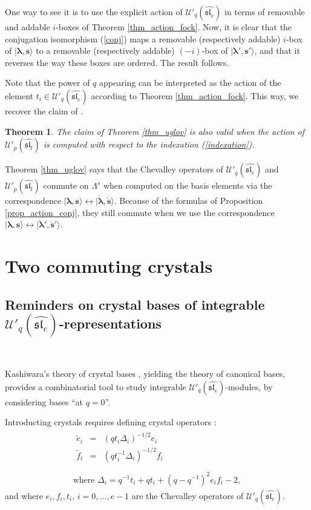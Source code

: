 \documentclass[twoside,12pt]{amsart}
\theoremstyle{plain}
\newcommand{\bs}{\mathbf{s}}
\newcommand{\la}{\lambda}
\newcommand{\La}{\Lambda}
\newcommand{\De}{\Delta}
\newcommand{\bla}{\boldsymbol{\la}}
\newcommand{\te}{\tilde{e}}
\newcommand{\tf}{\tilde{f}}
\newcommand{\dbs}{\dot{\bs}}
\newcommand{\dbla}{\dot{\bla}}
\newcommand{\Ue}{\mathcal{U}'_q (\widehat{\mathfrak{sl}_e})}
\newcommand{\Ul}{\mathcal{U}'_p (\widehat{\mathfrak{sl}_l})}
\newtheorem{thm}[num]{Theorem}
\theoremstyle{remark}
\begin{document}
\proof
One way to see it is to use the explicit action of $\Ue$ 
in terms of removable and addable $i$-boxes
of Theorem \ref{thm_action_fock}. 
Now, it is clear that the conjugation isomorphism (\ref{conj})
maps a removable (respectively addable) $i$-box of $|\bla,\bs\rangle$
to a removable (respectively addable) $(-i)$-box of $|\bla',\bs'\rangle$,
and that it reverses the way these boxes are ordered.
The result follows.
\endproof


Note that the power of $q$ appearing can be interpreted as the action of the
element $t_i\in\Ue$ according to Theorem \ref{thm_action_fock}.
This way, we recover the claim of \cite[Proposition 5.10]{Uglov1999}.

\medskip

\begin{thm}\label{thm_uglov_bis}
The claim of Theorem \ref{thm_uglov} is also valid when the action
of $\Ul$ is computed with respect to the indexation (\ref{indexation}).
\end{thm}

\proof 
Theorem \ref{thm_uglov} says that the Chevalley operators of $\Ue$ and $\Ul$ commute on $\La^s$
when computed on the basis elements via
the correspondence $|\bla,\bs\rangle \leftrightarrow |\dbla,\dbs\rangle$.
Because of the formulas of Proposition \ref{prop_action_conj}, they still commute when we use the correspondence
$|\bla,\bs\rangle \leftrightarrow |\dbla',\dbs'\rangle$.
\endproof
  
  
  
  
  
  
\section{Two commuting crystals}\label{double_crystal}

\subsection{Reminders on crystal bases of integrable $\Ue$-representations}\label{crystal_bases}\


Kashiwara's theory of crystal bases \cite{Kashiwara1990},
yielding the theory of canonical bases, 
provides a combinatorial tool to study integrable $\Ue$-modules, by considering bases ``at $q=0$''.

Introducting crystals requires defining crystal operators \cite[Section 2.4]{Kashiwara1991}:
\begin{equation}\label{def_crystal_op}
\begin{array}{c}
\begin{array}{lcl}
\te^{}_i & = & (q t_i \De_i)^{-1/2}e_i \\
\tf^{}_i & = & (q t_i^{-1} \De_i)^{-1/2}f_i \\
\end{array}
\\
\text{where } \De_i=q^{-1}t_i+qt_i+(q-q^{-1})^2e_if_i-2,
\end{array}
\end{equation}
and where $e_i,f_i,t_i$, $i=0,\dots,e-1$ are the Chevalley operators of $\Ue$.
\end{document}
